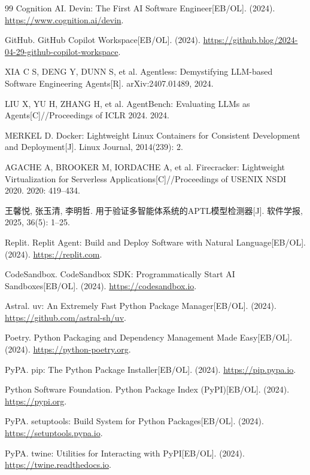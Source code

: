 \documentclass[10pt]{ctexart}
\begin{document}
\begin{thebibliography}{99}
Cognition AI.
 Devin: The First AI Software Engineer[EB/OL]. (2024). \url{https://www.cognition.ai/devin}.

GitHub.
 GitHub Copilot Workspace[EB/OL]. (2024). \url{https://github.blog/2024-04-29-github-copilot-workspace}.

XIA C S, DENG Y, DUNN S, et al.
 Agentless: Demystifying LLM-based Software Engineering Agents[R]. arXiv:2407.01489, 2024.

LIU X, YU H, ZHANG H, et al.
 AgentBench: Evaluating LLMs as Agents[C]//Proceedings of ICLR 2024. 2024.

MERKEL D.
 Docker: Lightweight Linux Containers for Consistent Development and Deployment[J]. Linux Journal, 2014(239): 2.

AGACHE A, BROOKER M, IORDACHE A, et al.
 Firecracker: Lightweight Virtualization for Serverless Applications[C]//Proceedings of USENIX NSDI 2020. 2020: 419--434.

王馨悦, 张玉清, 李明哲.
 用于验证多智能体系统的APTL模型检测器[J]. 软件学报, 2025, 36(5): 1--25.

Replit.
 Replit Agent: Build and Deploy Software with Natural Language[EB/OL]. (2024). \url{https://replit.com}.

CodeSandbox.
 CodeSandbox SDK: Programmatically Start AI Sandboxes[EB/OL]. (2024). \url{https://codesandbox.io}.

Astral.
 uv: An Extremely Fast Python Package Manager[EB/OL]. (2024). \url{https://github.com/astral-sh/uv}.

Poetry.
 Python Packaging and Dependency Management Made Easy[EB/OL]. (2024). \url{https://python-poetry.org}.

PyPA.
 pip: The Python Package Installer[EB/OL]. (2024). \url{https://pip.pypa.io}.

Python Software Foundation.
 Python Package Index (PyPI)[EB/OL]. (2024). \url{https://pypi.org}.

PyPA.
 setuptools: Build System for Python Packages[EB/OL]. (2024). \url{https://setuptools.pypa.io}.

PyPA.
 twine: Utilities for Interacting with PyPI[EB/OL]. (2024). \url{https://twine.readthedocs.io}.


\end{thebibliography}
\end{document}

